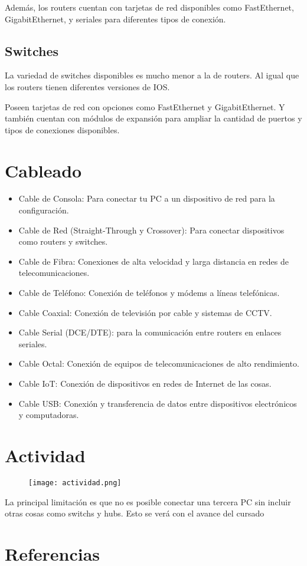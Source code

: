\documentclass[11pt, a4paper]{article}
\begin{document}
Además, los routers cuentan con tarjetas de red disponibles como FastEthernet, GigabitEthernet, y seriales para diferentes tipos de conexión.

\subsection{Switches}

La variedad de switches disponibles es mucho menor a la de routers. Al igual que los routers tienen diferentes versiones de IOS. 

Poseen tarjetas de red con opciones como FastEthernet y GigabitEthernet. Y también cuentan con módulos de expansión para ampliar la cantidad de puertos y tipos de conexiones disponibles.

\section{Cableado}

\begin{itemize}
    \item Cable de Consola: Para conectar tu PC a un dispositivo de red para la configuración.
    \item Cable de Red (Straight-Through y Crossover): Para conectar dispositivos como routers y switches.
    \item Cable de Fibra: Conexiones de alta velocidad y larga distancia en redes de telecomunicaciones.
     \item Cable de Teléfono: Conexión de teléfonos y módems a líneas telefónicas.
    \item Cable Coaxial: Conexión de televisión por cable y sistemas de CCTV.
    \item Cable Serial (DCE/DTE): para la comunicación entre routers en enlaces seriales.
    \item Cable Octal: Conexión de equipos de telecomunicaciones de alto rendimiento.
    \item Cable IoT: Conexión de dispositivos en redes de Internet de las cosas.
    \item Cable USB: Conexión y transferencia de datos entre dispositivos electrónicos y computadoras.
\end{itemize}


\section{Actividad}

\begin{figure} [H]
    \centering
    \texttt{[image: actividad.png]}
\end{figure}
La principal limitación es que no es posible conectar una tercera PC sin incluir otras cosas como switchs y hubs. Esto se verá con el avance del cursado

\section{Referencias}
\end{document}
